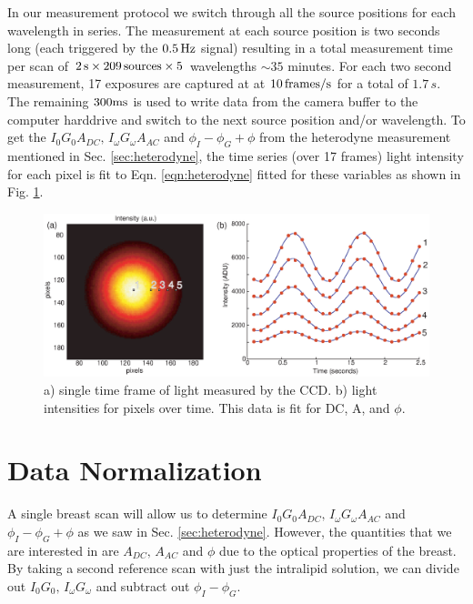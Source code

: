In our measurement protocol we switch through all the source positions for each wavelength in series. The measurement at each source position is two seconds long (each triggered by the $0.5\,{\rm Hz}$ signal) resulting in a total measurement time per scan of $2\,{\rm s} \times 209\,{\rm sources} \times 5$ wavelengths $\sim 35$ minutes. For each two second measurement, 17 exposures are captured at at $10\,{\rm frames/s}$ for a total of $1.7\,s$. The remaining $300 {\rm ms}$ is used to write data from the camera buffer to the computer harddrive and switch to the next source position and/or wavelength. To get the $I_{0}G_{0}A_{DC},\,I_{\omega}G_{\omega}A_{AC}$ and $\phi_I-\phi_G+\phi$ from the heterodyne measurement mentioned in Sec. \ref{sec:heterodyne}, the time series (over 17 frames) light intensity for each pixel is fit to Eqn. \ref{eqn:heterodyne} fitted for these variables as shown in Fig. \ref{fig:timeseries}. 
\begin{figure}[ht]
\begin{center}
\includegraphics[width=14.5cm]{./figures/4_Gen3/timeseries.eps}
\caption{a) single time frame of light measured by the CCD. b) light intensities for pixels over time. This data is fit for DC, A, and $\phi$.}
\label{fig:timeseries}
\end{center}
\end{figure}

\section{Data Normalization}
\label{sec:datanorm}
A single breast scan will allow us to determine $I_{0}G_{0}A_{DC},\,I_{\omega}G_{\omega}A_{AC}$ and $\phi_I-\phi_G+\phi$ as we saw in Sec. \ref{sec:heterodyne}. However, the quantities that we are interested in are $A_{DC},\,A_{AC}$ and $\phi$ due to the optical properties of the breast. By taking a second reference scan with just the intralipid solution, we can divide out $I_{0}G_{0},\,I_{\omega}G_{\omega}$ and subtract out $\phi_I-\phi_G$.


